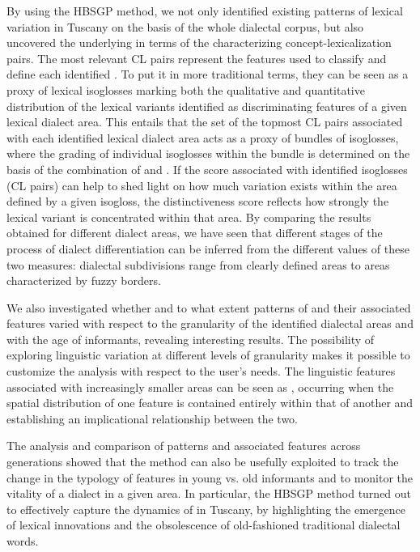 \documentclass[output=paper]{LSP/langsci}
\begin{document}
By using the HBSGP method, we not only identified existing patterns of lexical variation in Tuscany on the basis of the whole dialectal corpus, but also uncovered the underlying  in terms of the characterizing concept-lexicalization pairs. The most relevant CL pairs represent the features used to classify and define each identified . To put it in more traditional terms, they can be seen as a proxy of lexical isoglosses marking both the qualitative and quantitative distribution of the lexical variants identified as discriminating features of a given lexical dialect area. This entails that the set of the topmost CL pairs associated with each identified lexical dialect area acts as a proxy of bundles of isoglosses, where the grading of individual isoglosses within the bundle is determined on the basis of the combination of  and . If the  score associated with identified isoglosses (CL pairs) can help to shed light on how much variation exists within the area defined by a given isogloss, the distinctiveness score reflects how strongly the lexical variant is concentrated within that area. By comparing the results obtained for different dialect areas, we have seen that different stages of the process of dialect differentiation can be inferred from the different values of these two measures: dialectal subdivisions range from clearly defined areas to areas characterized by fuzzy borders. 

We also investigated whether and to what extent patterns of  and their associated features varied with respect to the granularity of the identified dialectal areas and with the age of informants, revealing interesting results. The possibility of exploring linguistic variation at different levels of granularity makes it possible to customize the analysis with respect to the user’s needs. The linguistic features associated with increasingly smaller areas can be seen as , occurring when the spatial distribution of one feature is contained entirely within that of another and establishing an implicational relationship between the two. 

The analysis and comparison of  patterns and associated features across generations showed that the method can also be usefully exploited to track the change in the typology of features in young vs. old informants and to monitor the vitality of a dialect in a given area. In particular, the HBSGP method turned out to effectively capture the dynamics of  in Tuscany, by highlighting the emergence of lexical innovations and the obsolescence of old-fashioned traditional dialectal words. 
\end{document}

